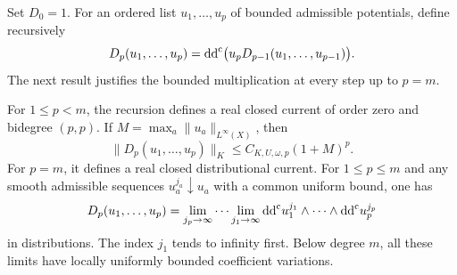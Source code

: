 Set $D_0=1$. For an ordered list $u_1,\ldots,u_p$ of bounded
admissible potentials, define recursively
\begin{equation}\label{eq:hessian-bounded-recursion}
 D_p(u_1,\ldots,u_p)
 =\mathrm{dd}^{\mathrm{c}}\bigl(u_pD_{p-1}(u_1,\ldots,u_{p-1})\bigr).
\end{equation}
The next result justifies the bounded multiplication at every step up
to $p=m$.

\begin{proposition}\label{hessian:bounded-recursive-currents}
For $1\leq p<m$, the recursion defines a real closed current of order
zero and bidegree $(p,p)$. If
$M=\max_a\|u_a\|_{L^\infty(X)}$, then
\[
 \|D_p(u_1,\ldots,u_p)\|_K
       \leq C_{K,U,\omega,p}(1+M)^p.
\]
For $p=m$, it defines a real closed distributional current. For
$1\leq p\leq m$ and any smooth admissible sequences
$u_a^{j_a}\downarrow u_a$ with a common uniform bound, one has
\begin{equation}\label{eq:hessian-bounded-iterated-limit}
 D_p(u_1,\ldots,u_p)
 =\lim_{j_p\to\infty}\cdots\lim_{j_1\to\infty}
    \mathrm{dd}^{\mathrm{c}} u_1^{j_1}\wedge\cdots\wedge\mathrm{dd}^{\mathrm{c}} u_p^{j_p}
\end{equation}
in distributions. The index $j_1$ tends to infinity first. Below degree
$m$, all these limits have locally uniformly bounded coefficient
variations.
\end{proposition}

